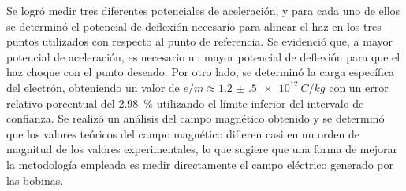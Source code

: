 Se logró medir tres diferentes potenciales de aceleración, y para cada uno de ellos se determinó el potencial de deflexión necesario
para alinear el haz en los tres puntos utilizados con respecto al punto de referencia. Se evidenció que, a mayor potencial de aceleración,
es necesario un mayor potencial de deflexión para que el haz choque con el punto deseado. Por otro lado, se determinó la carga específica del 
electrón, obteniendo un valor de \(e / m \approx \qty{1.2(5)e+12}{C \per kg}\) con un error relativo porcentual del \qty{2.98}{\percent} 
utilizando el límite inferior del intervalo de confianza. Se realizó un análisis del campo magnético obtenido y se determinó que los valores 
teóricos del campo magnético difieren casi en un orden de magnitud de los valores experimentales, lo que sugiere que una forma de mejorar la 
metodología empleada es medir directamente el campo eléctrico generado por las bobinas.
